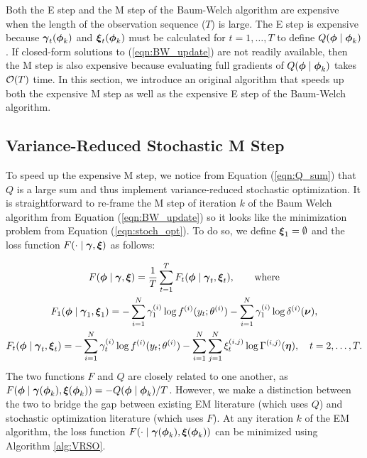 Both the E step and the M step of the Baum-Welch algorithm are expensive when the length of the observation sequence ($T$) is large. The E step is expensive because $\boldsymbol{\gamma}_t(\boldsymbol{\phi}_{k})$ and $\boldsymbol{\xi}_t(\boldsymbol{\phi}_{k})$ must be calculated for $t = 1,\ldots,T$ to define $Q(\boldsymbol{\phi} \mid \boldsymbol{\phi}_k)$. If closed-form solutions to (\ref{eqn:BW_update}) are not readily available, then the M step is also expensive because evaluating full gradients of $Q(\boldsymbol{\phi} \mid \boldsymbol{\phi}_{k})$ takes $\mathcal{O}(T)$ time. In this section, we introduce an original algorithm that speeds up both the expensive M step as well as the expensive E step of the Baum-Welch algorithm.

\subsection{Variance-Reduced Stochastic M Step}
\label{subsec:stoch_M}

To speed up the expensive M step, we notice from Equation (\ref{eqn:Q_sum}) that $Q$ is a large sum and thus implement variance-reduced stochastic optimization. It is straightforward to re-frame the M step of iteration $k$ of the Baum Welch algorithm from Equation (\ref{eqn:BW_update}) so it looks like the minimization problem from Equation (\ref{eqn:stoch_opt}). To do so, we define $\boldsymbol{\xi}_1 = \emptyset$ and the loss function $F(\cdot \mid \boldsymbol{\gamma},\boldsymbol{\xi})$ as follows:

\begin{gather}
    F(\boldsymbol{\phi} \mid \boldsymbol{\gamma}, \boldsymbol{\xi}) = \frac{1}{T}\sum_{t=1}^T F_t(\boldsymbol{\phi} \mid \boldsymbol{\gamma}_t , \boldsymbol{\xi}_t), \qquad \text{where} \label{eqn:F}\\
    F_1(\boldsymbol{\phi} \mid \boldsymbol{\gamma}_1,\boldsymbol{\xi}_1) = - \sum_{i=1}^N \gamma^{(i)}_1 \log f^{(i)}(y_t;\theta^{(i)}) - \sum_{i=1}^N \gamma^{(i)}_1 \log \delta^{(i)}(\boldsymbol{\nu}), \label{eqn:F_1} \\
    F_t(\boldsymbol{\phi} \mid \boldsymbol{\gamma}_t , \boldsymbol{\xi}_t) = - \sum_{i=1}^N \gamma^{(i)}_t \log f^{(i)}(y_t;\theta^{(i)}) - \sum_{i=1}^N \sum_{j=1}^N \xi^{(i,j)}_t \log \Gamma^{(i,j)}(\boldsymbol{\eta}), \quad t = 2, \ldots, T. \label{eqn:F_t}
\end{gather}
%
The two functions $F$ and $Q$ are closely related to one another, as $F(\boldsymbol{\phi} \mid \boldsymbol{\gamma}(\boldsymbol{\phi}_k), \boldsymbol{\xi}(\boldsymbol{\phi}_k)) = - Q(\boldsymbol{\phi} \mid \boldsymbol{\phi}_k) / T$. However, we make a distinction between the two to bridge the gap between existing EM literature (which uses $Q$) and stochastic optimization literature (which uses $F$). At any iteration $k$ of the EM algorithm, the loss function $F(\cdot \mid \boldsymbol{\gamma}(\boldsymbol{\phi}_k),\boldsymbol{\xi}(\boldsymbol{\phi}_k))$ can be minimized using Algorithm \ref{alg:VRSO}.


